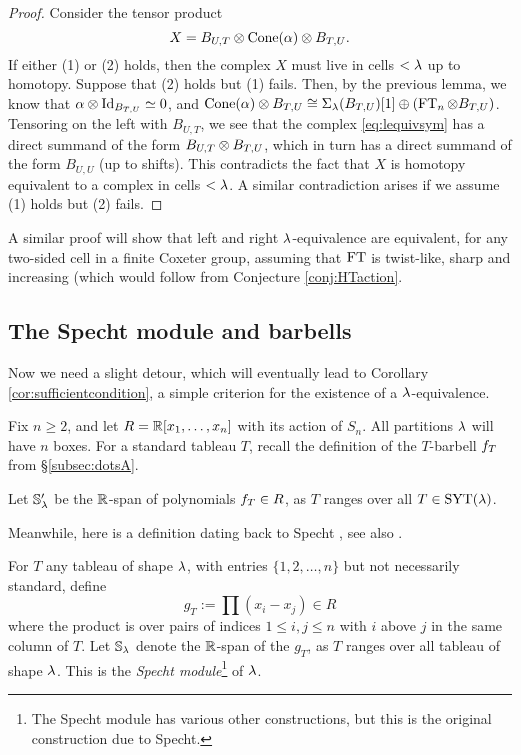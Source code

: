 \begin{proof}
Consider the tensor product
\begin{equation}\label{eq:lequivsym}
X = B_{U,T} \otimes \operatorname{Cone}(\alpha) \otimes B_{T,U}.
\end{equation}
If either (1) or (2) holds, then the complex $X$ must live in cells $< \lambda$ up to homotopy. Suppose that (2) holds but (1) fails. Then, by the previous lemma, we know that $\alpha \otimes \operatorname{Id}_{B_{T,U}} \simeq 0$, and $\operatorname{Cone}(\alpha) \otimes B_{T,U}\cong \Sigma_{\lambda}(B_{T,U})[1]\oplus (\operatorname{FT}_n\otimes B_{T,U})$.  Tensoring on the left with $B_{U,T}$, we see that the complex \eqref{eq:lequivsym} has a direct summand of the form $B_{U,T} \otimes B_{T,U}$, which in turn has a direct summand of the form $B_{U,U}$ (up to shifts).  This contradicts the fact that $X$ is homotopy equivalent to a complex in cells $< \lambda$. A similar contradiction arises if we assume (1) holds but (2) fails. \end{proof}

\begin{remark} A similar proof will show that left and right $\lambda$-equivalence are equivalent, for any two-sided cell in a finite Coxeter group, assuming that $\operatorname{FT}$ is twist-like, sharp and increasing (which would follow from Conjecture \ref{conj:HTaction}. \end{remark}

\subsection{The Specht module and barbells}
\label{subsec:specht}

Now we need a slight detour, which will eventually lead to Corollary \ref{cor:sufficientcondition}, a simple criterion for the existence of a $\lambda$-equivalence.

Fix $n \ge 2$, and let $R = {\mathbb{R}}[x_1, \ldots, x_n]$ with its action of $S_n$. All partitions $\lambda$ will have $n$ boxes. For a standard tableau $T$, recall the definition of the $T$-barbell
$f_{T}$ from \S \ref{subsec:dotsA}.

\begin{defn} \label{def:barbellSpecht} Let ${\mathbb{S}}_\lambda'$ be the ${\mathbb{R}}$-span of polynomials $f_{T}\in R$, as $T$ ranges over all $T\in \operatorname{SYT}(\lambda)$.\end{defn}

Meanwhile, here is a definition dating back to Specht \cite{Specht35}, see also \cite{Peel75}.

\begin{defn}\label{def:specht}
For $T$ any tableau of shape $\lambda$, with entries $\{1, 2, \ldots, n\}$ but not necessarily standard,  define $$g_T := \prod (x_i - x_j) \in R$$ where the product is over pairs of indices
$1\leq i, j\leq n$ with $i$ above $j$ in the same column of $T$. Let ${\mathbb{S}}_\lambda$ denote the ${\mathbb{R}}$-span of the $g_T$, as $T$ ranges over all tableau of shape $\lambda$. This is the \emph{Specht module}\footnote{The Specht module has various other constructions, but this is the original construction due to Specht.} of $\lambda$.
\end{defn}

